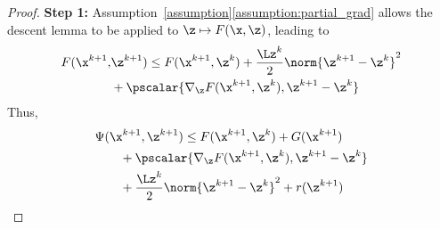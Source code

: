 \begin{proof}
%
\textbf{Step 1:} Assumption~\ref{assumption}\ref{assumption:partial_grad} allows the descent lemma \cite[p. 683]{Bertsekas1999} to be applied to $\z \mapsto F(\x, \z)$, leading to
%
\begin{align} \label{eq:descent_z}
F(\x^{k+1}, &\z^{k+1}) \leq F(\x^{k+1},\z^k) + \frac{\Lz^k}{2} \norm{\z^{k+1} - \z^k}^2 \nonumber \\
&+ \pscalar{\nabla_{\z} F(\x^{k+1},\z^k), \z^{k+1} - \z^k} 
\end{align}
%
Thus,
%
\begin{align}
    &\Psi(\x^{k+1},\z^{k+1}) \leq F(\x^{k+1},\z^k) + G(\x^{k+1}) \nonumber \\
    & \qquad + \pscalar{\nabla_{\z} F(\x^{k+1},\z^k), \z^{k+1} - \z^k}  \nonumber \\
    & \qquad + \frac{\Lz^k}{2} \norm{\z^{k+1} - \z^k}^2 + r(\z^{k+1}) \nonumber
\end{align}
    

\end{proof}

